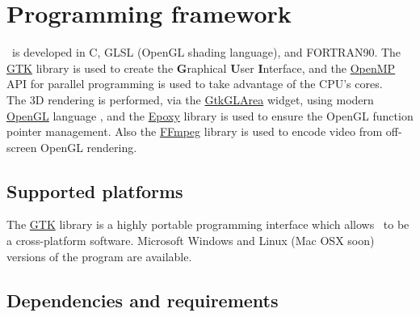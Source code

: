 \chapter{Programming framework}
\label{frame}

\atomes\ is developed in C, GLSL (OpenGL shading language), and  FORTRAN90. 
The \href{https://www.gtk.org/}{GTK} \cite{gtk} library is used to create the {\bf{G}}raphical {\bf{U}}ser {\bf{I}}nterface, and the \href{https://www.openmp.org/}{OpenMP} \cite{OpenMP} API for parallel programming is used to take advantage of the CPU's cores. \\
The 3D rendering is performed, via the \href{https://developer.gnome.org/gtk3/stable/GtkGLArea.html}{GtkGLArea} widget, using modern \href{https://www.opengl.org/}{OpenGL} language \cite{OpenGL},
and the \href{https://github.com/anholt/libepoxy}{Epoxy} library is used to ensure the OpenGL function pointer management. 
Also the  \href{https://www.ffmpeg.org/}{FFmpeg} \cite{ffmpeg} library is used to encode video from off-screen OpenGL rendering. 

\section{Supported platforms}

The \href{https://www.gtk.org/}{GTK} library is a highly portable programming interface which allows \atomes\ to be a cross-platform software. 
Microsoft Windows and Linux (Mac OSX soon) versions of the program are available. 

\section{Dependencies and requirements}

